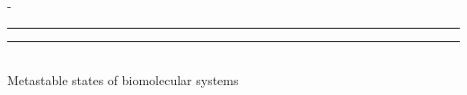 %
%
% 
%
%
\begin{titlingpage}
\begin{SingleSpace}
\calccentering{\unitlength} 
\begin{adjustwidth*}{\unitlength}{-\unitlength}
\vspace*{13mm}
\begin{center}
\rule[0.5ex]{\linewidth}{2pt}\vspace*{-\baselineskip}\vspace*{3.2pt}
\rule[0.5ex]{\linewidth}{1pt}\\[\baselineskip]

{\HUGE Metastable states of biomolecular systems}\\[4mm]


\end{center}
\end{adjustwidth*}
\end{SingleSpace}
\end{titlingpage}
